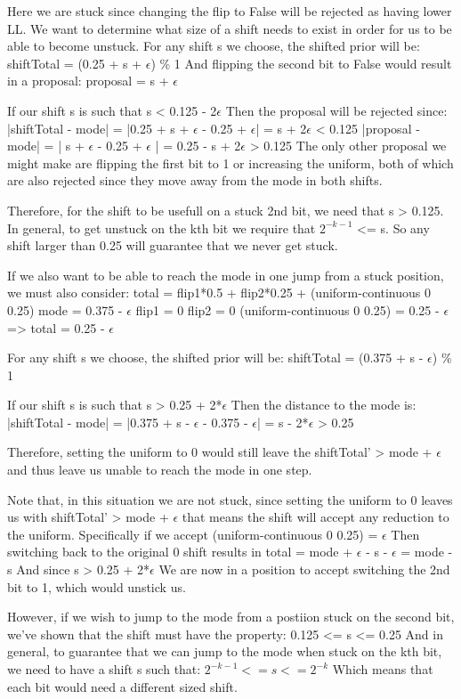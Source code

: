 Here we are stuck since changing the flip to False will be rejected as having lower LL. We want to determine what size of a shift needs to exist in order for us to be able to become unstuck.
For any shift s we choose, the shifted prior will be:
shiftTotal = (0.25 + s + $\epsilon$) \% 1 
And flipping the second bit to False would result in a proposal:
proposal = s + $\epsilon$

If our shift s is such that 
s < 0.125 - 2$\epsilon$
Then the proposal will be rejected since:
|shiftTotal - mode| = |0.25 + s + $\epsilon$ - 0.25 + $\epsilon$| = s + 2$\epsilon$ < 0.125
|proposal - mode| = | s + $\epsilon$ - 0.25 + $\epsilon$ | = 0.25 - s + 2$\epsilon$ > 0.125
The only other proposal we might make are flipping the first bit to 1 or increasing the uniform, both of which are also rejected since they move away from the mode in both shifts.

Therefore, for the shift to be usefull on a stuck 2nd bit, we need that s > 0.125. In general, to get unstuck on the kth bit we require that $2^{-k-1}$ <= s. So any shift larger than 0.25 will guarantee that we never get stuck.

If we also want to be able to reach the mode in one jump from a stuck position, we must also consider:
total = flip1*0.5 + flip2*0.25 + (uniform-continuous 0 0.25)
mode = 0.375 - $\epsilon$
flip1 = 0
flip2 = 0
(uniform-continuous 0 0.25) = 0.25 - $\epsilon$ 
=> total = 0.25 - $\epsilon$

For any shift s we choose, the shifted prior will be:
shiftTotal = (0.375 + s - $\epsilon$) \% 1 

If our shift s is such that
s > 0.25 + 2*$\epsilon$
Then the distance to the mode is:
|shiftTotal - mode| = |0.375 + s - $\epsilon$ - 0.375 - $\epsilon$| = s - 2*$\epsilon$ > 0.25

Therefore, setting the uniform to 0 would still leave the shiftTotal' > mode + $\epsilon$  and thus leave us unable to reach the mode in one step.

Note that, in this situation we are not stuck, since setting the uniform to 0 leaves us with shiftTotal' > mode + $\epsilon$ that means the shift will accept any reduction to the uniform. Specifically if we accept (uniform-continuous 0 0.25) = $\epsilon$ Then switching back to the original 0 shift results in total = mode + $\epsilon$ - s - $\epsilon$ = mode - s And since s > 0.25 + 2*$\epsilon$ We are now in a position to accept switching the 2nd bit to 1, which would unstick us.

However, if we wish to jump to the mode from a postiion stuck on the second bit, we've shown that the shift must have the property:
0.125 <= s <= 0.25
And in general, to guarantee that we can jump to the mode when stuck on the kth bit, we need to have a shift s such that:
$2^{-k-1} <= s <= 2^{-k}$ Which means that each bit would need a different sized shift. 

